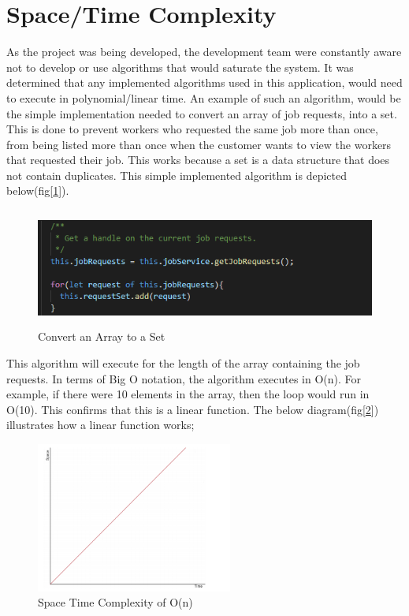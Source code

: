 \section{Space/Time Complexity}
\label{sec:SystemEvaluationComplexity}

As the project was being developed, the development team were constantly aware not to develop or use algorithms that would saturate the system. It was determined that any implemented algorithms used in this application, would need to execute in polynomial/linear time. An example of such an algorithm, would be the simple implementation needed to convert an array of job requests, into a set. This is done to prevent workers who requested the same job more than once, from being listed more than once when the customer wants to view the workers that requested their job. This works because a set is a data structure that does not contain duplicates. This simple implemented algorithm is depicted below(fig[\ref{fig:array}]). 

\begin{figure}[H]
    \centering
    \includegraphics[width=\textwidth, height=110pt]{img/forLoop.PNG}
    \caption{Convert an Array to a Set}
    \label{fig:array}
\end{figure}

\bigskip

This algorithm will execute for the length of the array containing the job requests. In terms of Big O notation, the algorithm executes in O(n). For example, if there were 10 elements in the array, then the loop would run in O(10). This confirms that this is a linear function. The below diagram(fig[\ref{fig:spaceTime}]) illustrates how a linear function works;

\begin{figure}[H]
    \centering
    \includegraphics[width=\textwidth, height=140pt]{img/Linear.PNG}
    \caption{Space Time Complexity of O(n)}
    \label{fig:spaceTime}
\end{figure}

